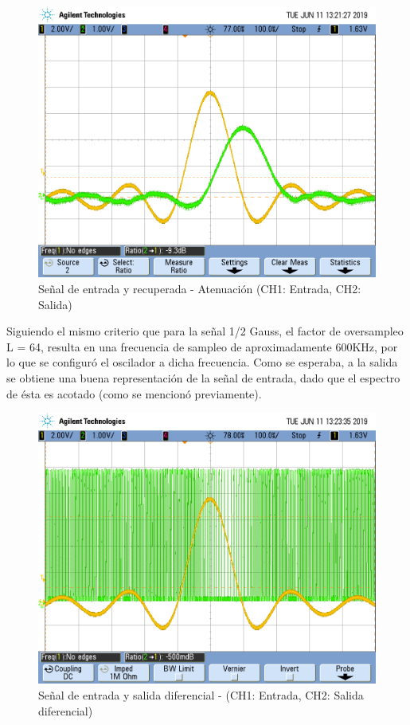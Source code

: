 \documentclass[assd_tp3_main.tex]{subfiles}
\begin{document}
\begin{figure}[!ht]
\begin{centering}
\includegraphics[scale=0.25]{../EJ4/Mediciones/Sinc/s3_1a.png}
\par\end{centering}
\caption{Señal de entrada y recuperada - Atenuación (CH1: Entrada, CH2: Salida)}
\end{figure}

Siguiendo el mismo criterio que para la señal 1/2 Gauss, el factor de oversampleo L = 64, resulta en una frecuencia de sampleo de aproximadamente 600KHz, por lo que se configuró el oscilador a dicha frecuencia. Como se esperaba, a la salida se obtiene una buena representación de la señal de entrada, dado que el espectro de ésta es acotado (como se mencionó previamente).

\begin{figure}[!ht]
\begin{centering}
\includegraphics[scale=0.25]{../EJ4/Mediciones/Sinc/s3_2.png}
\par\end{centering}
\caption{Señal de entrada y salida diferencial - (CH1: Entrada, CH2: Salida diferencial)}
\end{figure}
\end{document}
